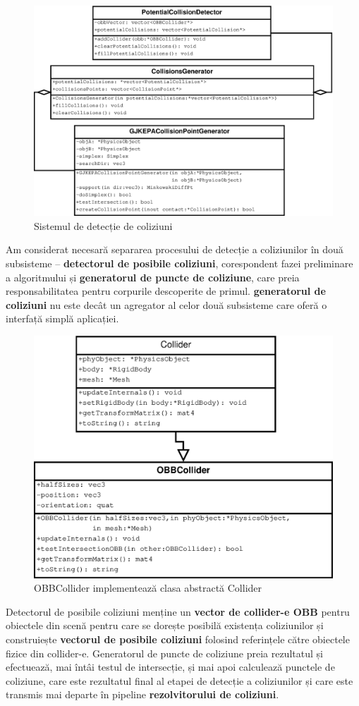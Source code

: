 \documentclass[12pt,a4paper]{report}
\begin{document}
\begin{figure}[H]
	\centering
	\includegraphics[width=0.8\linewidth]{pics/CollisionDetectionSmall.eps}
	\caption[]{Sistemul de detecție de coliziuni}
	\label{fig:CollisionDetectionSmall}
\end{figure}

Am considerat necesară separarea procesului de detecție a coliziunilor în două subsisteme -- \textbf{detectorul de posibile coliziuni}, corespondent fazei preliminare a algoritmului și \textbf{generatorul de puncte de coliziune}, care preia responsabilitatea pentru corpurile descoperite de primul. \textbf{generatorul de coliziuni} nu este decât un agregator al celor două subsisteme care oferă o interfață simplă aplicației.

\begin{figure}[H]
	\centering
	\includegraphics[width=0.7\linewidth]{pics/collider.eps}
	\caption[]{OBBCollider implementează clasa abstractă Collider}
	\label{fig:collider}
\end{figure}

Detectorul de posibile coliziuni menține un \textbf{vector de collider-e OBB} pentru obiectele din scenă pentru care se dorește posibilă existența coliziunilor și construiește \textbf{vectorul de posibile coliziuni} folosind referințele către obiectele fizice din collider-e. Generatorul de puncte de coliziune preia rezultatul și efectuează, mai întâi testul de intersecție, și mai apoi calculează punctele de coliziune, care este rezultatul final al etapei de detecție a coliziunilor și care este transmis mai departe în pipeline \textbf{rezolvitorului de coliziuni}.
\end{document}
